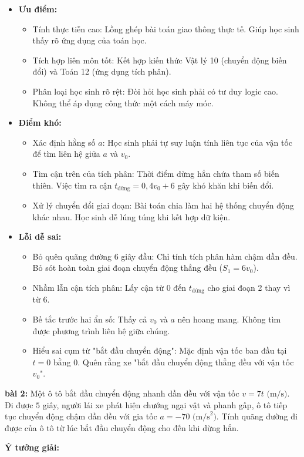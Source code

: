 \documentclass[12pt,a4paper,oneside]{book}
\theoremstyle{theorem}
\theoremstyle{definition}
\begin{document}
\begin{itemize}
    \item \textbf{Ưu điểm:} 
    \begin{itemize}
    \item Tính thực tiễn cao: Lồng ghép bài toán giao thông thực tế. Giúp học sinh thấy rõ ứng dụng của toán học.
    \item Tích hợp liên môn tốt: Kết hợp kiến thức Vật lý 10 (chuyển động biến đổi) và Toán 12 (ứng dụng tích phân).
    \item Phân loại học sinh rõ rệt: Đòi hỏi học sinh phải có tư duy logic cao. Không thể áp dụng công thức một cách máy móc.
    \end{itemize}
    \item \textbf{Điểm khó:}
    \begin{itemize}
        \item Xác định hằng số $a$: Học sinh phải tự suy luận tính liên tục của vận tốc để tìm liên hệ giữa $a$ và $v_{0}$.
        \item Tìm cận trên của tích phân: Thời điểm dừng hẳn chứa tham số biến thiên. Việc tìm ra cận $t_{\text{dừng}} = 0,4v_0 + 6$ gây khó khăn khi biến đổi.
        \item Xử lý chuyển đổi giai đoạn: Bài toán chia làm hai hệ thống chuyển động khác nhau. Học sinh dễ lúng túng khi kết hợp dữ kiện.
    \end{itemize}
    \item \textbf{Lỗi dễ sai:}
    \begin{itemize}
        \item Bỏ quên quãng đường 6 giây đầu: Chỉ tính tích phân hàm chậm dần đều. Bỏ sót hoàn toàn giai đoạn chuyển động thẳng đều ($S_1 = 6v_0$).
        \item Nhầm lẫn cận tích phân: Lấy cận từ $0$ đến $t_{\text{dừng}}$ cho giai đoạn 2 thay vì từ $6$.
        \item Bế tắc trước hai ẩn số: Thấy cả $v_{0}$ và $a$ nên hoang mang. Không tìm được phương trình liên hệ giữa chúng.
        \item Hiểu sai cụm từ "bắt đầu chuyển động": Mặc định vận tốc ban đầu tại $t=0$ bằng $0$. Quên rằng xe "bắt đầu chuyển động thẳng đều với vận tốc $v_{0}$".
    \end{itemize}
\end{itemize}
\noindent\textbf{bài 2:} Một ô tô bắt đầu chuyển động nhanh dần đều với vận tốc $v = 7t\text{ (m/s)}$. Đi được $5$ giây, người lái xe phát hiện chướng ngại vật và phanh gấp, ô tô tiếp tục chuyển động chậm dần đều với gia tốc $a = -70\text{ (m/s}^2\text{)}$. Tính quãng đường đi được của ô tô từ lúc bắt đầu chuyển động cho đến khi dừng hẳn.
\begin{center}
    \textbf{Ý tưởng giải:}
\end{center} 
\end{document}
